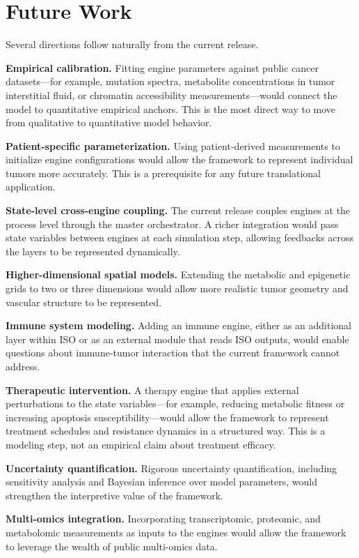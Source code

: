 \documentclass[12pt,a4paper]{article}
\begin{document}
\section{Future Work}
\label{sec:future}

Several directions follow naturally from the current release.

\textbf{Empirical calibration.} Fitting engine parameters against public cancer datasets---for example, mutation spectra, metabolite concentrations in tumor interstitial fluid, or chromatin accessibility measurements---would connect the model to quantitative empirical anchors. This is the most direct way to move from qualitative to quantitative model behavior.

\textbf{Patient-specific parameterization.} Using patient-derived measurements to initialize engine configurations would allow the framework to represent individual tumors more accurately. This is a prerequisite for any future translational application.

\textbf{State-level cross-engine coupling.} The current release couples engines at the process level through the master orchestrator. A richer integration would pass state variables between engines at each simulation step, allowing feedbacks across the layers to be represented dynamically.

\textbf{Higher-dimensional spatial models.} Extending the metabolic and epigenetic grids to two or three dimensions would allow more realistic tumor geometry and vascular structure to be represented.

\textbf{Immune system modeling.} Adding an immune engine, either as an additional layer within ISO or as an external module that reads ISO outputs, would enable questions about immune-tumor interaction that the current framework cannot address.

\textbf{Therapeutic intervention.} A therapy engine that applies external perturbations to the state variables---for example, reducing metabolic fitness or increasing apoptosis susceptibility---would allow the framework to represent treatment schedules and resistance dynamics in a structured way. This is a modeling step, not an empirical claim about treatment efficacy.

\textbf{Uncertainty quantification.} Rigorous uncertainty quantification, including sensitivity analysis and Bayesian inference over model parameters, would strengthen the interpretive value of the framework.

\textbf{Multi-omics integration.} Incorporating transcriptomic, proteomic, and metabolomic measurements as inputs to the engines would allow the framework to leverage the wealth of public multi-omics data.
\end{document}
